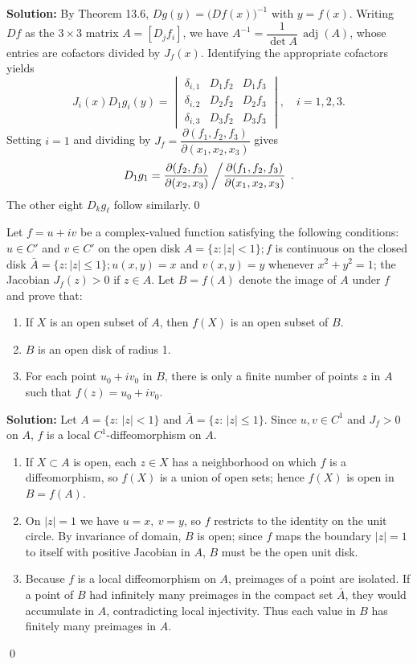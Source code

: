 \noindent\textbf{Solution:}
By Theorem 13.6, $Dg(y)=\big(Df(x)\big)^{-1}$ with $y=f(x)$. Writing $Df$ as the $3\times3$ matrix $A=[D_j f_i]$, we have $A^{-1}=\dfrac{1}{\det A}\,\operatorname{adj}(A)$, whose entries are cofactors divided by $J_f(x)$. Identifying the appropriate cofactors yields
\[J_i(x)D_1g_i(y)=\begin{vmatrix}
\delta_{i,1} & D_1f_2 & D_1f_3\\
\delta_{i,2} & D_2f_2 & D_2f_3\\
\delta_{i,3} & D_3f_2 & D_3f_3
\end{vmatrix},\quad i=1,2,3.
\]
Setting $i=1$ and dividing by $J_f=\dfrac{\partial(f_1,f_2,f_3)}{\partial(x_1,x_2,x_3)}$ gives
\[D_1g_1=\frac{\partial(f_2,f_3)}{\partial(x_2,x_3)}\left/\frac{\partial(f_1,f_2,f_3)}{\partial(x_1,x_2,x_3)}\right.\,.
\]
The other eight $D_k g_\ell$ follow similarly.\qed


\begin{problembox}
Let \( f = u + iv \) be a complex-valued function satisfying the following conditions: \( u \in C' \) and \( v \in C' \) on the open disk \( A = \{z : |z| < 1\}; f \) is continuous on the closed disk \( \bar{A} = \{z : |z| \leq 1\}; u(x, y) = x \) and \( v(x, y) = y \) whenever \( x^2 + y^2 = 1 \); the Jacobian \( J_f(z) > 0 \) if \( z \in A \). Let \( B = f(A) \) denote the image of \( A \) under \( f \) and prove that:
\begin{enumerate}[label=(\alph*)]
    \item If \( X \) is an open subset of \( A \), then \( f(X) \) is an open subset of \( B \).
    \item \( B \) is an open disk of radius 1.
    \item For each point \( u_0 + iv_0 \) in \( B \), there is only a finite number of points \( z \) in \( A \) such that \( f(z) = u_0 + iv_0 \).
\end{enumerate}
\end{problembox}

\noindent\textbf{Solution:}
Let $A=\{z:\,|z|<1\}$ and $\bar A=\{z:\,|z|\le 1\}$. Since $u,v\in C^1$ and $J_f>0$ on $A$, $f$ is a local $C^1$-diffeomorphism on $A$.
\begin{enumerate}[label=(\alph*)]
    \item If $X\subset A$ is open, each $z\in X$ has a neighborhood on which $f$ is a diffeomorphism, so $f(X)$ is a union of open sets; hence $f(X)$ is open in $B=f(A)$.
    \item On $|z|=1$ we have $u=x,\ v=y$, so $f$ restricts to the identity on the unit circle. By invariance of domain, $B$ is open; since $f$ maps the boundary $|z|=1$ to itself with positive Jacobian in $A$, $B$ must be the open unit disk.
    \item Because $f$ is a local diffeomorphism on $A$, preimages of a point are isolated. If a point of $B$ had infinitely many preimages in the compact set $\bar A$, they would accumulate in $A$, contradicting local injectivity. Thus each value in $B$ has finitely many preimages in $A$.
\end{enumerate}\qed

